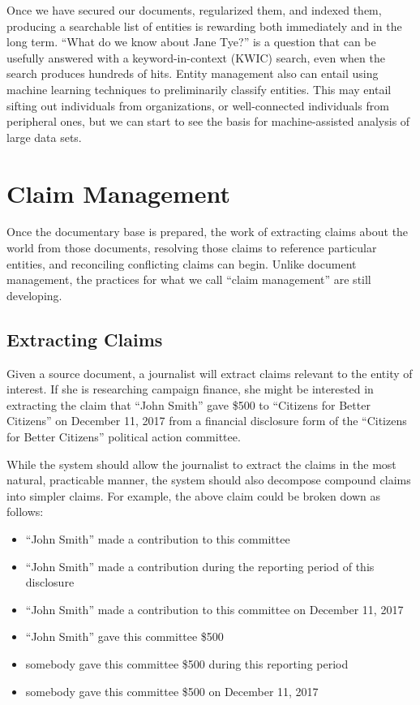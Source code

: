 \documentclass[format=siggraph, review=true]{acmart}
\begin{document}
Once we have secured our documents, regularized them, and indexed
them, producing a searchable list of entities is rewarding both
immediately and in the long term. ``What do we know about Jane Tye?''
is a question that can be usefully answered with a keyword-in-context
(KWIC) search, even when the search produces hundreds of hits. Entity
management also can entail using machine learning techniques to
preliminarily classify entities. This may entail sifting out
individuals from organizations, or well-connected individuals from
peripheral ones, but we can start to see the basis for
machine-assisted analysis of large data sets.

\section{Claim Management}
Once the documentary base is prepared, the work of extracting claims
about the world from those documents, resolving those claims to
reference particular entities, and reconciling conflicting claims can
begin. Unlike document management, the practices for what we call
``claim management'' are still developing.

\subsection{Extracting Claims}
Given a source document, a journalist will extract claims relevant to
the entity of interest. If she is researching campaign finance, she
might be interested in extracting the claim that ``John Smith''
gave \$500 to ``Citizens for Better Citizens'' on December 11, 2017
from a financial disclosure form of the ``Citizens for Better
Citizens'' political action committee.

While the system should allow the journalist to extract the claims in the
most natural, practicable manner, the system should also decompose compound
claims into simpler claims. For example, the above
claim could be broken down as follows:

\begin{itemize}
\item ``John Smith'' made a contribution to this committee
\item ``John Smith'' made a contribution during the reporting period of this disclosure
\item ``John Smith'' made a contribution to this committee on December 11, 2017
\item ``John Smith'' gave this committee \$500
\item somebody gave this committee \$500 during this reporting period
\item somebody gave this committee \$500 on December 11, 2017
\end{itemize}
\end{document}
